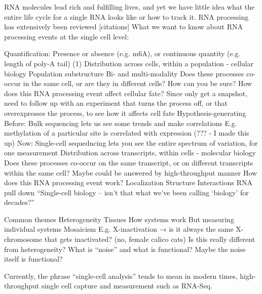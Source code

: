 RNA molecules lead rich and fulfilling lives, and yet we have little idea what the entire life cycle for a single RNA looks like or how to track it.
RNA processing has extensively been reviewed [citations]
What we want to know about RNA processing events at the single cell level:


Quantification: Presence or absence (e.g. m6A), or continuous quantity (e.g. length of poly-A tail)
(1) Distribution across cells, within a population - cellular biology
Population substructure
Bi- and multi-modality
Does these processes co-occur in the same cell, or are they in different cells?
How can you be sure?
How does this RNA processing event affect cellular fate?
Since only get a snapshot, need to follow up with an experiment that turns the process off, or that overexpresses the process, to see how it affects cell fate
Hypothesis-generating
Before:
Bulk sequencing lets us see some trends and make correlations
E.g. methylation of a particular site is correlated with expression (??? - I made this up)
Now:
Single-cell sequedncing lets you see the entire spectrum of variation, for one measurement
Distribution across transcripts, within cells - molecular biology
Does these processes co-occur on the same transcript, or on different transcripts within the same cell?
Maybe could be answered by high-throughput manner
How does this RNA processing event work?
Localization
Structure
Interactions
RNA pull down
``Single-cell biology -- isn't that what we've been calling ‘biology' for decades?'' \cite{Symmons2016-xn}

Common themes
Heterogeneity
Tissues
How systems work
But measuring individual systems
Mosaicism
E.g. X-inactivation → is it always the same X-chromosome that gets inactivated? (no, female calico cats)
Is this really different from heterogeneity?
What is ``noise'' and what is functional? Maybe the noise itself is functional?

Currently, the phrase ``single-cell analysis'' tends to mean in modern times, high-throughput single cell capture and measurement such as RNA-Seq.


